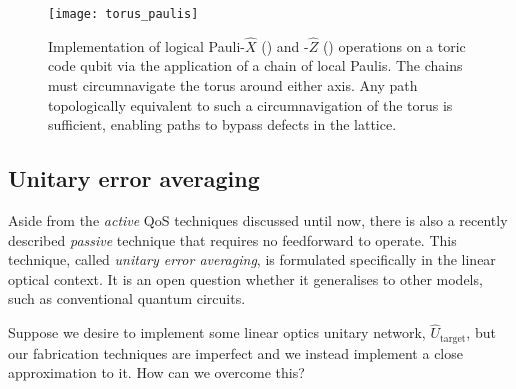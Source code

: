 \begin{figure}[!htb]
	\texttt{[image: torus\_paulis]}
	\caption{Implementation of logical Pauli-$\hat{X}$ () and -$\hat{Z}$ () operations on a toric code qubit via the application of a chain of local Paulis. The chains must circumnavigate the torus around either axis. Any path topologically equivalent to such a circumnavigation of the torus is sufficient, enabling paths to bypass defects in the lattice.} \label{fig:toric_code_paulis}
\end{figure}









%
%

\subsection{Unitary error averaging} \label{sec:error_averaging}

Aside from the \textit{active} QoS techniques discussed until now, there is also a recently described \textit{passive} technique that requires no feedforward to operate. This technique, called \textit{unitary error averaging}, is formulated specifically in the linear optical context. It is an open question whether it generalises to other models, such as conventional quantum circuits.

Suppose we desire to implement some linear optics unitary network, $\hat{U}_\text{target}$, but our fabrication techniques are imperfect and we instead implement a close approximation to it. How can we overcome this?

